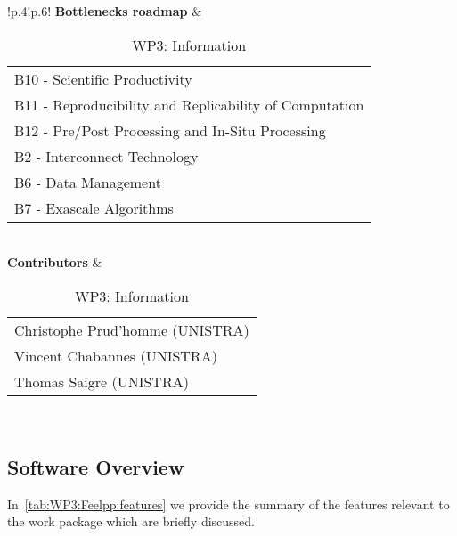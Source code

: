 \begin{table}[!ht]
{{\begin{tabular}{!{\color{numpexgray}\vrule}p{.4\textwidth}!{\color{numpexgray}\vrule}p{.6\textwidth}!{\color{numpexgray}\vrule}}
        \textbf{Bottlenecks roadmap} & \begin{tabular}{l}
B10 - Scientific Productivity\\
B11 - Reproducibility and Replicability of Computation\\
B12 - Pre/Post Processing and In-Situ Processing\\
B2 - Interconnect Technology\\
B6 - Data Management\\
B7 - Exascale Algorithms\\
\end{tabular} \\
\textbf{Contributors} & \begin{tabular}{l}
    Christophe Prud'homme (UNISTRA)\\
    Vincent Chabannes (UNISTRA)\\
    Thomas Saigre (UNISTRA)\\
\end{tabular}\\
        \hline
    \end{tabular}
    }}
    \caption{WP3: \Feelpp Information}
\end{table}

\subsection{Software Overview}
\label{sec:WP3:Feelpp:summary}

In~\cref{tab:WP3:Feelpp:features} we provide the summary of the \Feelpp features relevant to the work package which are briefly discussed.

